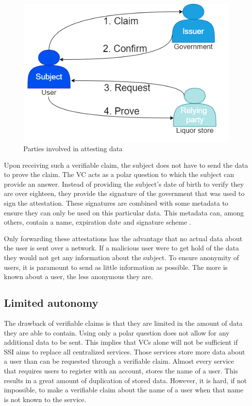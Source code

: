 \begin{figure}[h]
\centering
\includegraphics[scale=0.35]{figures/attestation.png}
\vspace{-0.3cm}
\caption{Parties involved in attesting data}
\label{fig:attestations}
\end{figure}

Upon receiving such a verifiable claim, the subject does not have to send the data to prove the claim. The VC acts as a polar question to which the subject can provide an answer. Instead of providing the subject's date of birth to verify they are over eighteen, they provide the signature of the government that was used to sign the attestation. These signatures are combined with some metadata to ensure they can only be used on this particular data. This metadata can, among others, contain a name, expiration date and signature scheme \cite{survey}.

Only forwarding these attestations has the advantage that no actual data about the user is sent over a network. If a malicious user were to get hold of the data they would not get any information about the subject. To ensure anonymity of users, it is paramount to send as little information as possible. The more is known about a user, the less anonymous they are.

\subsection{Limited autonomy}
The drawback of verifiable claims is that they are limited in the amount of data they are able to contain. Using only a polar question does not allow for any additional data to be sent. This implies that VCs alone will not be sufficient if SSI aims to replace all centralized services. Those services store more data about a user than can be requested through a verifiable claim. Almost every service that requires users to register with an account, stores the name of a user. This results in a great amount of duplication of stored data. However, it is hard, if not impossible, to make a verifiable claim about the name of a user when that name is not known to the service.

